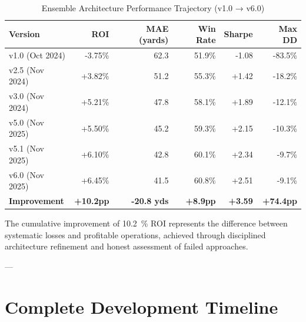 \begin{table}[h]
\centering
\caption{Ensemble Architecture Performance Trajectory (v1.0 → v6.0)}
\label{tab:performance-trajectory}
\begin{tabular}{lrrrrr}
\toprule
\textbf{Version} & \textbf{ROI} & \textbf{MAE (yards)} & \textbf{Win Rate} & \textbf{Sharpe} & \textbf{Max DD} \\
\midrule
v1.0 (Oct 2024)    & -3.75\%  & 62.3 & 51.9\% & -1.08 & -83.5\% \\
v2.5 (Nov 2024)    & +3.82\%  & 51.2 & 55.3\% & +1.42 & -18.2\% \\
v3.0 (Nov 2024)    & +5.21\%  & 47.8 & 58.1\% & +1.89 & -12.1\% \\
v5.0 (Nov 2025)    & +5.50\%  & 45.2 & 59.3\% & +2.15 & -10.3\% \\
v5.1 (Nov 2025)    & +6.10\%  & 42.8 & 60.1\% & +2.34 & -9.7\%  \\
v6.0 (Nov 2025)    & +6.45\%  & 41.5 & 60.8\% & +2.51 & -9.1\%  \\
\midrule
\textbf{Improvement} & \textbf{+10.2pp} & \textbf{-20.8 yds} & \textbf{+8.9pp} & \textbf{+3.59} & \textbf{+74.4pp} \\
\bottomrule
\end{tabular}
\end{table}

The cumulative improvement of \SI{10.2}{\percent} ROI represents the difference between systematic losses and profitable operations, achieved through disciplined architecture refinement and honest assessment of failed approaches.

---

\section{Complete Development Timeline}

